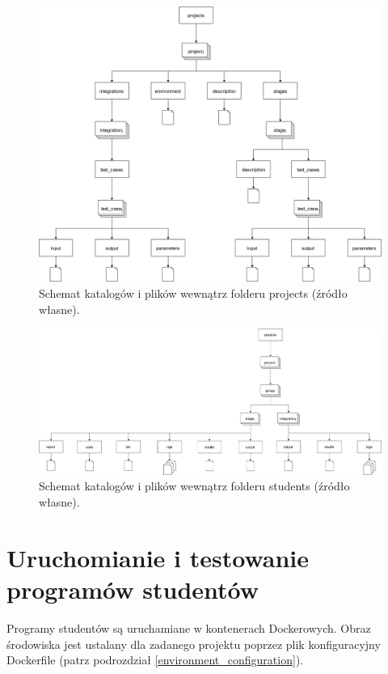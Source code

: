 \begin{figure}[H]
    \centering
    \includegraphics[width = 13cm]{chapter02/projects_dirs.png}
    \caption{Schemat katalogów i plików wewnątrz folderu projects (źródło własne).}
    \label{fig:projects-directories}
\end{figure}

\begin{figure}[H]
    \centering
    \includegraphics[width = 13cm]{chapter02/students_dirs.png}
    \caption{Schemat katalogów i plików wewnątrz folderu students (źródło własne).}
    \label{fig:students-directories}
\end{figure}

\section{Uruchomianie i testowanie programów studentów}
\label{run-and-test}

Programy studentów są uruchamiane w kontenerach Dockerowych.
Obraz środowiska jest ustalany dla zadanego projektu poprzez plik konfiguracyjny Dockerfile (patrz podrozdział \ref{environment_configuration}).

